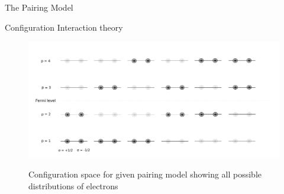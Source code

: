 \documentclass[twoside,english]{uiofysmaster}
\begin{document}
\begin{chapter}{The Pairing Model}
\begin{section}{Configuration Interaction theory}
		\begin{figure}[H]
			\includegraphics[width=1.1\linewidth]{Figures/Pairing_model2.pdf}
			\label{PairingModel_2}
			\caption{Configuration space for given pairing model showing all possible distributions of electrons}
		\end{figure}


\end{section}
\end{chapter}
\end{document}
